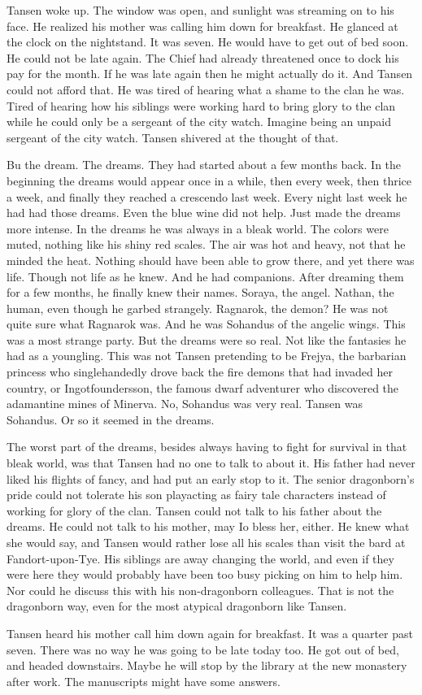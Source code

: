 \documentclass[11pt]{article}
\begin{document}
Tansen woke up. The window was open, and sunlight was streaming on to his
face. He realized his mother was calling him down for breakfast. He glanced at
the clock on the nightstand. It was seven. He would have to get out of bed
soon. He could not be late again. The Chief had already threatened once to
dock his pay for the month. If he was late again then he might actually do
it. And Tansen could not afford that. He was tired of hearing what a shame to
the clan he was. Tired of hearing how his siblings were working hard to bring
glory to the clan while he could only be a sergeant of the city watch. Imagine
being an unpaid sergeant of the city watch. Tansen shivered at the thought of
that.

Bu the dream. The dreams. They had started about a few months back. In the
beginning the dreams would appear once in a while, then every week, then thrice a
week, and finally they reached a crescendo last week. Every night last week he
had had those dreams. Even the blue wine did not help. Just made the dreams more
intense. In the dreams he was always in a bleak world. The colors were muted,
nothing like his shiny red scales. The air was hot and heavy, not that he minded
the heat. Nothing should have been able to grow there, and yet there was
life. Though not life as he knew. And he had companions. After dreaming them for
a few months, he finally knew their names. Soraya, the angel. Nathan, the
human, even though he garbed strangely. Ragnarok, the demon? He was not quite
sure what Ragnarok was. And he was Sohandus of the angelic wings. This was a
most strange party. But the dreams were so real. Not like the fantasies he had
as a youngling. This was not Tansen pretending to be Frejya, the barbarian
princess who singlehandedly drove back the fire demons that had invaded her
country, or Ingotfoundersson, the famous dwarf adventurer who discovered the
adamantine mines of Minerva. No, Sohandus was very real. Tansen was Sohandus. Or
so it seemed in the dreams.

The worst part of the dreams, besides always having to fight for survival in
that bleak world, was that Tansen had no one to talk to about it. His father had
never liked his flights of fancy, and had put an early stop to it. The senior
dragonborn's pride could not tolerate his son playacting as fairy tale
characters instead of working for glory of the clan. Tansen could not talk to
his father about the dreams. He could not talk to his mother, may Io bless her,
either. He knew what she would say, and Tansen would rather lose all his scales
than visit the bard at Fandort-upon-Tye. His siblings are away changing the
world, and even if they were here they would probably have been too busy
picking on him to help him. Nor could he discuss this with his non-dragonborn
colleagues. That is not the dragonborn way, even for the most atypical
dragonborn like Tansen.

Tansen heard his mother call him down again for breakfast. It was a quarter past
seven. There was no way he was going to be late today too. He got out of bed,
and headed downstairs. Maybe he will stop by the library at the new monastery
after work. The manuscripts might have some answers.
\end{document}
